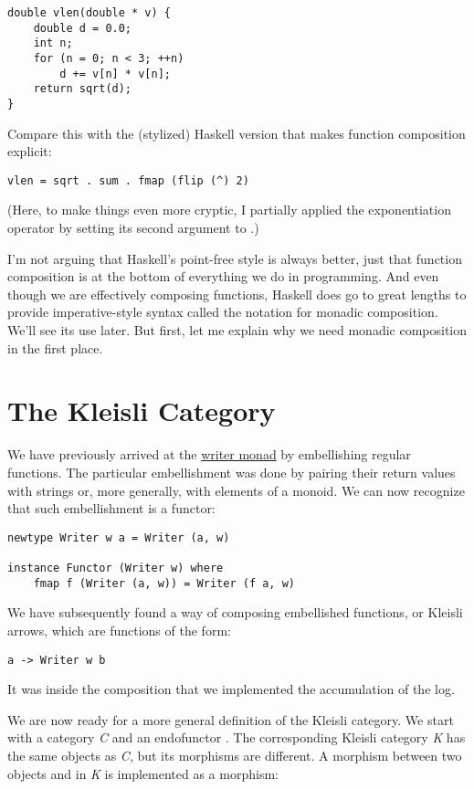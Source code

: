 \begin{verbatim}
double vlen(double * v) {
    double d = 0.0;
    int n;
    for (n = 0; n < 3; ++n)
        d += v[n] * v[n];
    return sqrt(d);
}
\end{verbatim}
Compare this with the (stylized) Haskell version that makes function
composition explicit:

\begin{verbatim}
vlen = sqrt . sum . fmap (flip (^) 2)
\end{verbatim}
(Here, to make things even more cryptic, I partially applied the
exponentiation operator \code{(\^{})} by setting its second argument
to .)

I'm not arguing that Haskell's point-free style is always better, just
that function composition is at the bottom of everything we do in
programming. And even though we are effectively composing functions,
Haskell does go to great lengths to provide imperative-style syntax
called the  notation for monadic composition. We'll see its
use later. But first, let me explain why we need monadic composition in
the first place.

\section{The Kleisli Category}\label{the-kleisli-category}

We have previously arrived at the
\hyperref[kleisli-categories]{writer
monad} by embellishing regular functions. The particular embellishment
was done by pairing their return values with strings or, more generally,
with elements of a monoid. We can now recognize that such embellishment
is a functor:

\begin{verbatim}
newtype Writer w a = Writer (a, w)

instance Functor (Writer w) where
    fmap f (Writer (a, w)) = Writer (f a, w)
\end{verbatim}
We have subsequently found a way of composing embellished functions, or
Kleisli arrows, which are functions of the form:

\begin{verbatim}
a -> Writer w b
\end{verbatim}

It was inside the composition that we implemented the accumulation of
the log.

We are now ready for a more general definition of the Kleisli category.
We start with a category \emph{C} and an endofunctor . The
corresponding Kleisli category \emph{K} has the same objects as
\emph{C}, but its morphisms are different. A morphism between two
objects  and  in \emph{K} is implemented as a
morphism:

